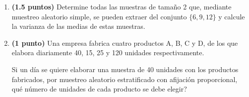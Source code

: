 
\begin{enumerate}[label=\alph*)]
\item \textbf{(1.5 puntos)} Determine todas las muestras de tamaño 2 que, mediante muestreo aleatorio simple, se pueden extraer del conjunto $\{6,9,12\}$ y calcule la varianza de las medias de estas muestras.
\item \textbf{(1 punto)} Una empresa fabrica cuatro productos A, B, C y D, de los que elabora diariamente 40, 15, 25 y 120 unidades respectivamente.

Si un día se quiere elaborar una muestra de 40 unidades con los productos fabricados, por muestreo aleatorio estratificado con afijación proporcional, \textquestiondown{}qué número de unidades de cada producto se debe elegir?
\end{enumerate}

